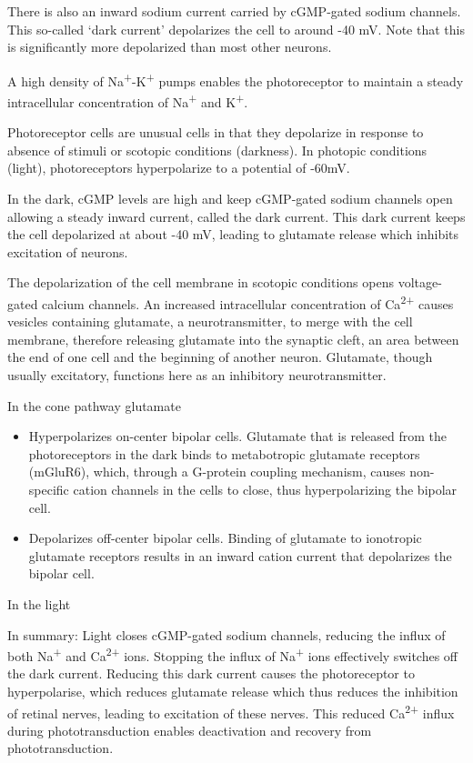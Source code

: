 There is also an inward sodium current carried by cGMP-gated sodium channels. This so-called `dark current' depolarizes the cell to around -40 mV. Note that this is significantly more depolarized than most other neurons.

A high density of Na\textsuperscript{+}-K\textsuperscript{+} pumps enables the photoreceptor to maintain a steady intracellular concentration of Na\textsuperscript{+} and K\textsuperscript{+}.

Photoreceptor cells are unusual cells in that they depolarize in response to absence of stimuli or scotopic conditions (darkness). In photopic conditions (light), photoreceptors hyperpolarize to a potential of -60mV.

In the dark, cGMP levels are high and keep cGMP-gated sodium channels open allowing a steady inward current, called the dark current. This dark current keeps the cell depolarized at about -40 mV, leading to glutamate release which inhibits excitation of neurons.

The depolarization of the cell membrane in scotopic conditions opens voltage-gated calcium channels. An increased intracellular concentration of Ca\textsuperscript{2+} causes vesicles containing glutamate, a neurotransmitter, to merge with the cell membrane, therefore releasing glutamate into the synaptic cleft, an area between the end of one cell and the beginning of another neuron. Glutamate, though usually excitatory, functions here as an inhibitory neurotransmitter.

In the cone pathway glutamate

\begin{itemize}
\tightlist
\item
  Hyperpolarizes on-center bipolar cells. Glutamate that is released from the photoreceptors in the dark binds to metabotropic glutamate receptors (mGluR6), which, through a G-protein coupling mechanism, causes non-specific cation channels in the cells to close, thus hyperpolarizing the bipolar cell.
\item
  Depolarizes off-center bipolar cells. Binding of glutamate to ionotropic glutamate receptors results in an inward cation current that depolarizes the bipolar cell.
\end{itemize}

In the light

In summary: Light closes cGMP-gated sodium channels, reducing the influx of both Na\textsuperscript{+} and Ca\textsuperscript{2+} ions. Stopping the influx of Na\textsuperscript{+} ions effectively switches off the dark current. Reducing this dark current causes the photoreceptor to hyperpolarise, which reduces glutamate release which thus reduces the inhibition of retinal nerves, leading to excitation of these nerves. This reduced Ca\textsuperscript{2+} influx during phototransduction enables deactivation and recovery from phototransduction.

